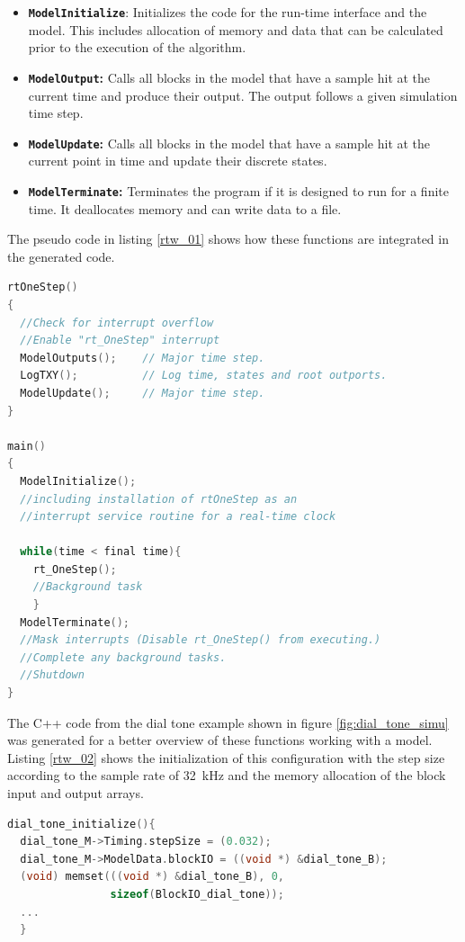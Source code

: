 \begin{itemize}
	\item \textbf{\texttt{ModelInitialize}}: Initializes the code for the run-time interface and the model. This includes  allocation of memory and data that can be calculated prior to the execution of the algorithm.
	\item \textbf{\texttt{ModelOutput}:} Calls all blocks in the model that have a sample hit at the current time and 
	produce their output. The output follows a given simulation time step.
	\item \textbf{\texttt{ModelUpdate}:} Calls all blocks in the model that have a sample hit at the current point in time and update their discrete states.
	\item \textbf{\texttt{ModelTerminate}:} Terminates the program if it is designed to run for a finite time. It deallocates memory and can write data to a file.
\end{itemize}

The pseudo code in listing \ref{rtw_01} shows how these functions are integrated in the generated code. 

\begin{lstlisting}[language=C,columns=flexible,caption= Structure of a generated model in pseudo code \cite{rtw_ug},label=rtw_01]
rtOneStep()
{
  //Check for interrupt overflow
  //Enable "rt_OneStep" interrupt
  ModelOutputs();    // Major time step.
  LogTXY();          // Log time, states and root outports.
  ModelUpdate();     // Major time step. 
}

main()
{
  ModelInitialize();
  //including installation of rtOneStep as an 
  //interrupt service routine for a real-time clock
  
  while(time < final time){
  	rt_OneStep();
    //Background task
    }
  ModelTerminate();
  //Mask interrupts (Disable rt_OneStep() from executing.)
  //Complete any background tasks.
  //Shutdown
}     
\end{lstlisting}

The C++ code from the dial tone example shown in figure \ref{fig:dial_tone_simu} was generated for a better overview of these functions working with a model. Listing \ref{rtw_02} shows the initialization of this configuration with the step size according to the sample rate of \SI{32}{kHz} and the memory allocation of the block input and output arrays.

\begin{lstlisting}[language=C,columns=flexible,caption= Initialization of the model,label=rtw_02]
dial_tone_initialize(){
  dial_tone_M->Timing.stepSize = (0.032);
  dial_tone_M->ModelData.blockIO = ((void *) &dial_tone_B);
  (void) memset(((void *) &dial_tone_B), 0,
                sizeof(BlockIO_dial_tone));
  ...
  }
\end{lstlisting}

